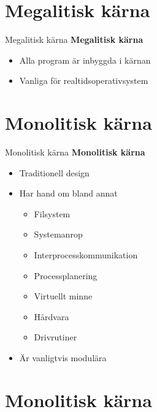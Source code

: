 \documentclass[compress, final]{beamer}
\begin{document}
\section{Megalitisk kärna}

\begin{frame}{Megalitisk kärna}
  \textbf{Megalitisk kärna}
  \begin{itemize}
    \item Alla program är inbyggda i kärnan
    \item Vanliga för realtidsoperativsystem
  \end{itemize}
\end{frame}


\section{Monolitisk kärna}

\begin{frame}{Monolitisk kärna}
  \textbf{Monolitisk kärna}
  \begin{itemize}
    \item Traditionell design
    \item Har hand om bland annat
    \begin{itemize}
      \item Filsystem
      \item Systemanrop
      \item Interprocesskommunikation
      \item Processplanering
      \item Virtuellt minne
      \item Hårdvara
      \item Drivrutiner
    \end{itemize}
    \item Är vanligtvis modulära
  \end{itemize}
\end{frame}


\section{Monolitisk kärna}
\end{document}
